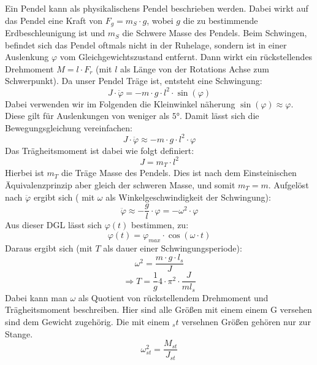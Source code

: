 \documentclass[twoside]{protokoll}
\begin{document}
Ein Pendel kann als physikalischens Pendel beschrieben werden.
Dabei wirkt auf das Pendel eine Kraft von $F_g = m_S \cdot g$, wobei $g$ die zu bestimmende Erdbeschleunigung ist und $m_S$ die Schwere Masse des Pendels.
Beim Schwingen, befindet sich das Pendel oftmals nicht in der Ruhelage, sondern ist in einer Auslenkung $\varphi$ vom Gleichgewichtszustand entfernt.
Dann wirkt ein rückstellendes Drehmoment $ M = l \cdot F_r$ (mit $l$ als Länge von der Rotations Achse zum Schwerpunkt).
Da unser Pendel Träge ist, entsteht eine Schwingung: 
\begin{equation}
    J \cdot \ddot{\varphi} = -m \cdot g \cdot l^2 \cdot \sin(\varphi)
\end{equation}
Dabei verwenden wir im Folgenden die Kleinwinkel näherung $\sin(\varphi) \approx \varphi$.
Diese gilt für Auslenkungen von weniger als $5$°. Damit lässt sich die Bewegungsgleichung vereinfachen:
\begin{equation}
    J \cdot \ddot{\varphi} \approx -m \cdot g \cdot l^2 \cdot \varphi
\end{equation}
Das Trägheitsmoment ist dabei wie folgt definiert:
\begin{equation}
    J =  m_T \cdot l^2
\end{equation}
Hierbei ist $m_T$ die Träge Masse des Pendels. Dies ist nach dem Einsteinischen Äquivalenzprinzip aber gleich der schweren Masse, und somit $m_T = m$.
Aufgelöst nach $\ddot{\varphi}$ ergibt sich ( mit $\omega$ als Winkelgeschwindigkeit der Schwingung):
\begin{equation}
    \ddot{\varphi} \approx -\frac{g}{l} \cdot \varphi = - \omega^2 \cdot \varphi
\end{equation}
Aus dieser DGL lässt sich $\varphi(t)$ bestimmen, zu:
\begin{equation}
    \varphi(t) = \varphi_{max} \cdot \cos(\omega \cdot t)
\end{equation}
Daraus ergibt sich (mit $T$ als dauer einer Schwingungsperiode):
\begin{equation}
    \omega^2 = \frac{m \cdot g \cdot l_s}{J}
\end{equation}
\begin{equation}
    \Rightarrow T = \frac{1}{g} 4 \cdot \pi^2 \cdot \frac{J}{m l_s}
\end{equation}
Dabei kann man $\omega$ als Quotient von rückstellendem Drehmoment und Trägheitsmoment beschreiben.
Hier sind alle Größen mit einem einem G versehen sind dem Gewicht zugehörig. Die mit einem $_st$ versehnen Größen gehören nur zur Stange.
\begin{equation}
    \omega_{st}^2 = \frac{M_{st}}{J_{st}}
\end{equation}
\end{document}
